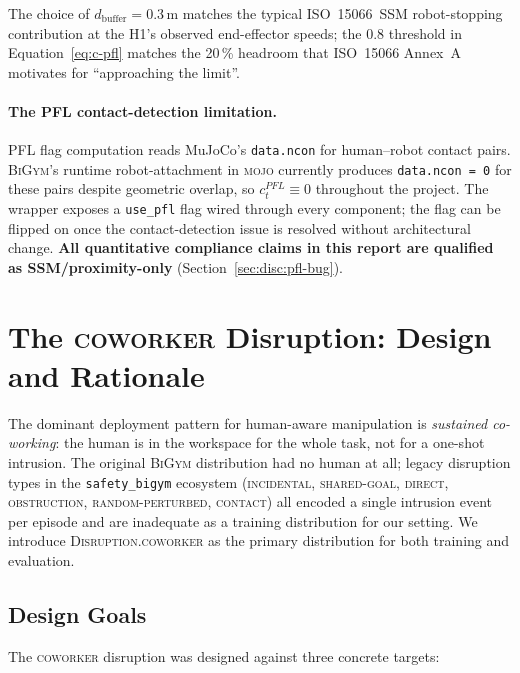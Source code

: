 \documentclass[11pt,a4paper]{report}
\newcommand{\ssm}{SSM}
\newcommand{\pfl}{PFL}
\newcommand{\iso}{ISO~15066}
\newcommand{\bigym}{\textsc{BiGym}}
\newcommand{\sbigym}{\texttt{safety\_bigym}}
\newcommand{\coworker}{\textsc{coworker}}
\begin{document}
The choice of $d_{\mathrm{buffer}} = 0.3$\,m matches the typical
\iso{}~\ssm{} robot-stopping contribution at the H1's observed
end-effector speeds; the 0.8 threshold in Equation~\ref{eq:c-pfl}
matches the 20\,\% headroom that \iso{} Annex~A motivates for
``approaching the limit''.

\paragraph{The \pfl{} contact-detection limitation.}
\pfl{} flag computation reads MuJoCo's \texttt{data.ncon} for
human--robot contact pairs. \bigym{}'s runtime robot-attachment in
\textsc{mojo} currently produces \texttt{data.ncon = 0} for these
pairs despite geometric overlap, so $c^{\pfl}_t \equiv 0$ throughout
the project. The wrapper exposes a \texttt{use\_pfl} flag wired
through every component; the flag can be flipped on once the
contact-detection issue is resolved without architectural change.
\textbf{All quantitative compliance claims in this report are
qualified as \ssm{}/proximity-only}
(Section~\ref{sec:disc:pfl-bug}).

\section{The \coworker{} Disruption: Design and Rationale}
\label{sec:bench:coworker}

The dominant deployment pattern for human-aware manipulation is
\emph{sustained co-working}: the human is in the workspace for the
whole task, not for a one-shot intrusion. The original \bigym{}
distribution had no human at all; legacy disruption types in the
\sbigym{} ecosystem (\textsc{incidental}, \textsc{shared-goal},
\textsc{direct}, \textsc{obstruction}, \textsc{random-perturbed},
\textsc{contact}) all encoded a single intrusion event per episode
and are inadequate as a training distribution for our setting. We
introduce \textsc{Disruption.coworker} as the primary distribution
for both training and evaluation.

\subsection{Design Goals}
\label{sec:bench:coworker:design}

The \coworker{} disruption was designed against three concrete
targets:
\end{document}
